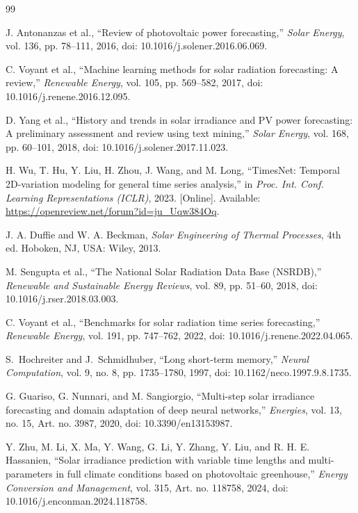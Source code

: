 \documentclass[10pt,conference,a4paper]{IEEEtran}
\begin{document}
\begin{thebibliography}{99}

J. Antonanzas et al., ``Review of photovoltaic power forecasting,''
\textit{Solar Energy}, vol. 136, pp. 78--111, 2016,
doi: 10.1016/j.solener.2016.06.069.

C. Voyant et al., ``Machine learning methods for solar radiation forecasting:
A review,'' \textit{Renewable Energy}, vol. 105, pp. 569--582, 2017,
doi: 10.1016/j.renene.2016.12.095.

D. Yang et al., ``History and trends in solar irradiance and PV power
forecasting: A preliminary assessment and review using text mining,''
\textit{Solar Energy}, vol. 168, pp. 60--101, 2018,
doi: 10.1016/j.solener.2017.11.023.

H. Wu, T. Hu, Y. Liu, H. Zhou, J. Wang, and M. Long, ``TimesNet: Temporal
2D-variation modeling for general time series analysis,'' in
\textit{Proc. Int. Conf. Learning Representations (ICLR)}, 2023. [Online].
Available: \url{https://openreview.net/forum?id=ju_Uqw384Oq}.

J. A. Duffie and W. A. Beckman, \textit{Solar Engineering of Thermal
Processes}, 4th ed. Hoboken, NJ, USA: Wiley, 2013.

M. Sengupta et al., ``The National Solar Radiation Data Base (NSRDB),''
\textit{Renewable and Sustainable Energy Reviews}, vol. 89, pp. 51--60, 2018,
doi: 10.1016/j.rser.2018.03.003.

C. Voyant et al., ``Benchmarks for solar radiation time series forecasting,''
\textit{Renewable Energy}, vol. 191, pp. 747--762, 2022,
doi: 10.1016/j.renene.2022.04.065.

S.~Hochreiter and J.~Schmidhuber, ``Long short-term memory,''
\textit{Neural Computation}, vol. 9, no. 8, pp. 1735--1780, 1997,
doi: 10.1162/neco.1997.9.8.1735.

G. Guariso, G. Nunnari, and M. Sangiorgio, ``Multi-step solar irradiance
forecasting and domain adaptation of deep neural networks,'' \textit{Energies},
vol. 13, no. 15, Art. no. 3987, 2020, doi: 10.3390/en13153987.

Y. Zhu, M. Li, X. Ma, Y. Wang, G. Li, Y. Zhang, Y. Liu, and R. H. E.
Hassanien, ``Solar irradiance prediction with variable time lengths and
multi-parameters in full climate conditions based on photovoltaic greenhouse,''
\textit{Energy Conversion and Management}, vol. 315, Art. no. 118758, 2024,
doi: 10.1016/j.enconman.2024.118758.


\end{thebibliography}
\end{document}
